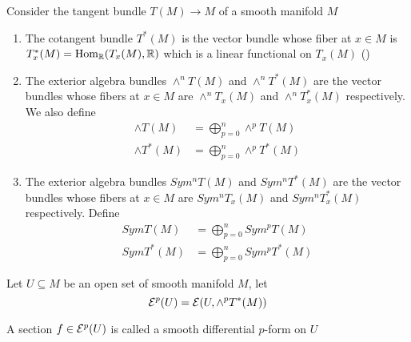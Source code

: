 \begin{definition}
	Consider the tangent bundle $T(M) \to M$ of a smooth manifold $M$
	\begin{enumerate}
		\item The cotangent bundle $T^*(M)$ is the vector bundle whose fiber at $x \in M$ is $T_x^*(M) = \operatorname{Hom}_{\mathbb{R}}(T_x(M), \mathbb{R})$ which is a linear functional on $T_x(M)$ ()
		
		\item The exterior algebra bundles $\wedge^n T(M)$ and $\wedge^n T^*(M)$ are the vector bundles whose fibers at $x \in M$ are $\wedge^n T_x(M)$ and $\wedge^n T_x^*(M)$ respectively. We also define
		\begin{align*}
			\wedge T(M) &= \bigoplus_{p=0}^n \wedge^p T(M) \\
			\wedge T^*(M) &= \bigoplus_{p=0}^n \wedge^p T^*(M)
		\end{align*}
		
		\item The exterior algebra bundles $Sym^n T(M)$ and $Sym^n T^*(M)$ are the vector bundles whose fibers at $x \in M$ are $Sym^n T_x(M)$ and $Sym^n T_x^*(M)$ respectively. Define
		\begin{align*}
			Sym T(M) &= \bigoplus_{p=0}^n Sym^p T(M) \\
			Sym T^*(M) &= \bigoplus_{p=0}^n Sym^p T^*(M)
		\end{align*}
		
	\end{enumerate}
\end{definition}

\begin{definition}
	Let $U \subseteq M$ be an open set of smooth manifold $M$, let
	$$
	\E^p(U) = \E\tuple*{U, \wedge^p T^*(M)}
	$$
	
	A section $f \in \mathcal{E}^p(U)$ is called a smooth differential $p$-form on $U$
\end{definition}

